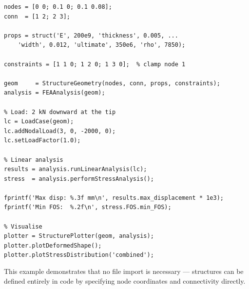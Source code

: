 \begin{lstlisting}[caption={Complete minimal example.}]
% Geometry
nodes = [0 0; 0.1 0; 0.1 0.08];
conn  = [1 2; 2 3];

props = struct('E', 200e9, 'thickness', 0.005, ...
    'width', 0.012, 'ultimate', 350e6, 'rho', 7850);

constraints = [1 1 0; 1 2 0; 1 3 0];  % clamp node 1

geom     = StructureGeometry(nodes, conn, props, constraints);
analysis = FEAAnalysis(geom);

% Load: 2 kN downward at the tip
lc = LoadCase(geom);
lc.addNodalLoad(3, 0, -2000, 0);
lc.setLoadFactor(1.0);

% Linear analysis
results = analysis.runLinearAnalysis(lc);
stress  = analysis.performStressAnalysis();

fprintf('Max disp: %.3f mm\n', results.max_displacement * 1e3);
fprintf('Min FOS:  %.2f\n', stress.FOS.min_FOS);

% Visualise
plotter = StructurePlotter(geom, analysis);
plotter.plotDeformedShape();
plotter.plotStressDistribution('combined');
\end{lstlisting}

This example demonstrates that no file import is necessary --- structures can
be defined entirely in code by specifying node coordinates and connectivity
directly.